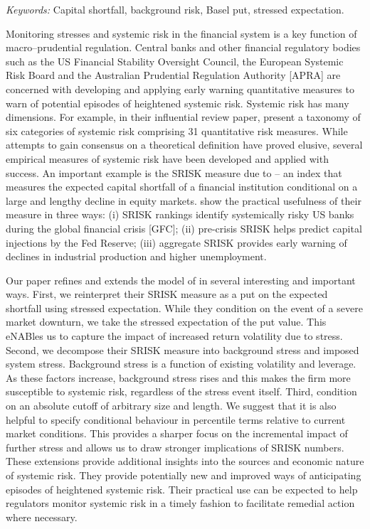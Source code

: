 \documentclass[12pt]{article}
\begin{document}
\noindent%
{\it Keywords:}  Capital shortfall, background risk, Basel put, stressed expectation.
\vfill

\newpage
{} %

Monitoring stresses and systemic risk in the financial system is a key function of macro--prudential regulation. Central banks and other financial regulatory bodies such as the US Financial Stability Oversight Council, the European Systemic Risk Board and the Australian Prudential Regulation Authority [APRA] are concerned with developing and applying early warning quantitative  measures  to warn of potential episodes of heightened systemic risk. Systemic risk has many dimensions. For example, in their influential review paper, \cite{Bisias2012} present a taxonomy of six categories of systemic risk comprising 31 quantitative risk measures. While attempts to gain consensus on a theoretical definition have proved elusive, several empirical measures of systemic risk have been developed and applied with  success.  An important example is the SRISK measure due to \cite{brownlees2015} -- an index that measures the expected capital shortfall of a financial institution conditional on a large and lengthy decline in equity markets. \cite{brownlees2015} show the practical usefulness of their measure in three ways: (i) SRISK rankings identify systemically risky US banks during the global financial crisis [GFC]; (ii) pre-crisis SRISK helps predict capital injections by the Fed Reserve; (iii) aggregate SRISK provides early warning of declines in industrial production and higher unemployment.

Our paper refines and extends the model of \cite{brownlees2015} in several interesting and important ways. First, we reinterpret their SRISK measure as a put on the expected shortfall using stressed expectation. While they condition on the event of a severe market downturn, we take the stressed expectation of the put value. This eNABles us to capture the impact of increased return volatility due to stress. Second, we decompose their SRISK measure into background stress and imposed system stress. Background stress is a function of existing volatility and leverage. As these factors increase, background stress rises and this makes the firm more susceptible to systemic risk, regardless of the stress event itself. Third,    
\cite{brownlees2015} condition on an absolute cutoff of arbitrary size and length. We suggest that it is also helpful to specify conditional behaviour in percentile terms relative to current market conditions. This provides a sharper focus on the incremental impact of further stress and allows us to draw stronger implications of SRISK numbers. These extensions provide additional insights into the sources and economic nature of systemic risk. They provide potentially new and improved ways of anticipating episodes of heightened systemic risk. Their practical use can be expected to help regulators monitor systemic risk in a timely fashion to facilitate remedial action where necessary.
\end{document}
